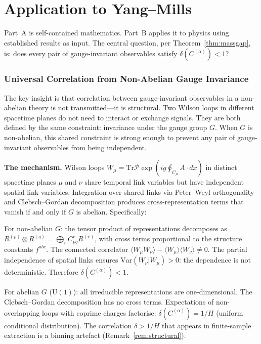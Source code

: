 \documentclass[11pt,a4paper]{article}
\theoremstyle{definition}
\theoremstyle{remark}
\newcommand{\Tr}{\mathrm{Tr}}
\begin{document}
\part{Application to Yang--Mills}\label{part:B}

Part~A is self-contained mathematics. Part~B applies it to physics using established results as input. The central question, per Theorem~\ref{thm:massgap}, is: does every pair of gauge-invariant observables satisfy $\delta(C^{(\alpha)})<1$?

\section{Universal Correlation from Non-Abelian Gauge Invariance}\label{sec:universal}

The key insight is that correlation between gauge-invariant observables in a non-abelian theory is not transmitted---it is structural. Two Wilson loops in different spacetime planes do not need to interact or exchange signals. They are both defined by the same constraint: invariance under the gauge group $G$. When $G$ is non-abelian, this shared constraint is strong enough to prevent any pair of gauge-invariant observables from being independent.

\textbf{The mechanism.} Wilson loops $W_\mu=\Tr\mathcal{P}\exp\!\left(ig\oint_{C_\mu}A\cdot dx\right)$ in distinct spacetime planes $\mu$ and $\nu$ share temporal link variables but have independent spatial link variables. Integration over shared links via Peter--Weyl orthogonality and Clebsch--Gordan decomposition produces cross-representation terms that vanish if and only if $G$ is abelian. Specifically:

For non-abelian $G$: the tensor product of representations decomposes as $R^{(p)}\otimes R^{(q)}=\bigoplus_r C^r_{pq}R^{(r)}$, with cross terms proportional to the structure constants $f^{abc}$. The connected correlator $\langle W_\mu W_\nu\rangle-\langle W_\mu\rangle\langle W_\nu\rangle\neq 0$. The partial independence of spatial links ensures $\mathrm{Var}(W_\nu|W_\mu)>0$: the dependence is not deterministic. Therefore $\delta(C^{(\alpha)})<1$.

For abelian $G$ ($\mathrm{U}(1)$): all irreducible representations are one-dimensional. The Clebsch--Gordan decomposition has no cross terms. Expectations of non-overlapping loops with coprime charges factorise: $\delta(C^{(\alpha)})=1/H$ (uniform conditional distribution). The correlation $\delta>1/H$ that appears in finite-sample extraction is a binning artefact (Remark~\ref{rem:structural}).
\end{document}
